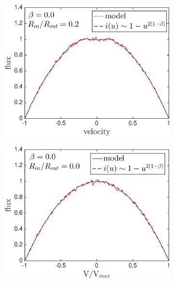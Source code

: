 \begin{figure}
\begin{subfigure}{0.5\textwidth}
\centering
\includegraphics[trim =0 25 45 15,clip=true,scale=0.4]{chapters/chapter4/images/params/A/b0_r0_2}
\end{subfigure}
\hspace{4mm}
\begin{subfigure}{0.5\textwidth}
\centering
\includegraphics[trim =72 25 45 15,clip=true,scale=0.4]{chapters/chapter4/images/params/A/b0_r0}  
\end{subfigure} \\[0.0ex]


\end{figure}
